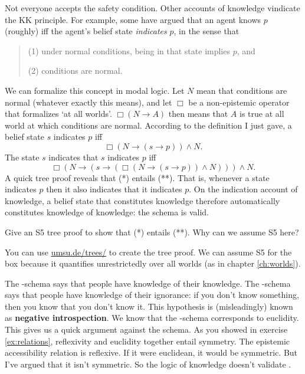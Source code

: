 Not everyone accepts the safety condition. Other accounts of knowledge vindicate
the KK principle. For example, some have argued that an agent knows $p$
(roughly) iff the agent's belief state \emph{indicates} $p$, in the sense that
%
\begin{quote}
\begin{enumerate*}
\item[(1)] under normal conditions, being in that state implies $p$, and
\item[(2)] conditions are normal.
\end{enumerate*}
\end{quote}
% 
We can formalize this concept in modal logic. Let $N$ mean that conditions are
normal (whatever exactly this means), and let $\Box$ be a non-epistemic operator
that formalizes `at all worlds'. $\Box(N \to A)$ then means that $A$ is true at
all world at which conditions are normal. According to the definition I just
gave, a belief state $s$ indicates $p$ iff
\begin{equation}\tag{*}
  \Box(N \to (s\to p)) \land N.
\end{equation}
The state $s$ indicates that $s$ indicates $p$ iff
\begin{equation}\tag{**}
  \Box(N \to (s \to (\Box(N \to (s \to p)) \land N))) \land N.
\end{equation}
A quick tree proof reveals that (*) entails (**). That is, whenever a state
indicates $p$ then it also indicates that it indicates $p$. On the indication
account of knowledge, a belief state that constitutes knowledge therefore
automatically constitutes knowledge of knowledge: the  schema is valid.

\begin{exercise}
  Give an S5 tree proof to show that (*) entails (**). Why can we
  assume S5 here?
\end{exercise}
\begin{solution}
  You can use
  \href{https://www.umsu.de/trees/}{umsu.de/trees/} to
  create the tree proof. We can assume S5 for the box because it quantifies
  unrestrictedly over all worlds (as in chapter \ref{ch:worlds}).
\end{solution}

The -schema says that people have knowledge of their knowledge. The
-schema says that people have knowledge of their ignorance: if you don't
know something, then you know that you don't know it. This hypothesis is
(misleadingly) known as \textbf{negative introspection}.
%
%
We know that the -schema corresponds to euclidity. This gives us a quick
argument against the schema. As you showed in exercise \ref{ex:relations},
reflexivity and euclidity together entail symmetry. The epistemic accessibility
relation is reflexive. If it were euclidean, it would be symmetric. But I've
argued that it isn't symmetric. So the logic of knowledge doesn't validate
.

